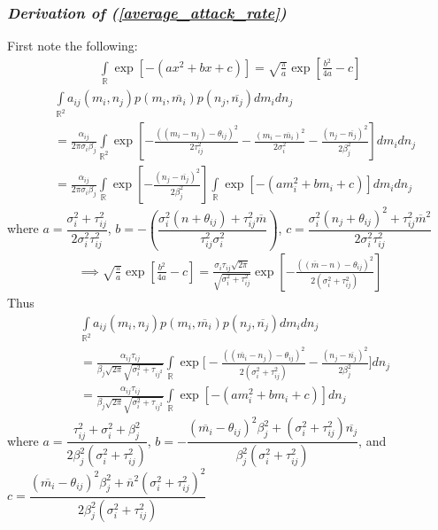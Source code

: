 \documentclass{amsart}
\theoremstyle{definition}
\theoremstyle{remark}
\numberwithin{equation}{section}
\begin{document}
\subsubsection*{\textbf{\textit{Derivation of (\ref{average_attack_rate})}}}
First note the following:
\begin{align*}
	\int\limits_{\mathbb{R}}\exp\left[-(ax^2 + bx + c)\right] = \sqrt{\frac{\pi}{a}}\exp\left[\frac{b^2}{4a} - c\right]
\end{align*}
\begin{align*}
	&\int\limits_{\mathbb{R}^2}a_{ij}(m_i, n_j)p(m_i, \overline{m_i})p(n_j, \overline{n_j})dm_idn_j \\
	&= \frac{\alpha_{ij}}{2\pi\sigma_i\beta_j}\int\limits_{\mathbb{R}^2}\exp\left[-\frac{((m_i - n_j) - \theta_{ij})^2}{2\tau_{ij}^2} - \frac{(m_i - \overline{m_i})^2}{2\sigma_i^2} - \frac{(n_j - \overline{n_j})^2}{2\beta_j^2}\right]dm_idn_j \\
	&= \frac{\alpha_{ij}}{2\pi\sigma_i\beta_j}\int\limits_{\mathbb{R}}\exp\left[-\frac{(n_j - \overline{n_j})^2}{2\beta_j^2}\right]\int\limits_{\mathbb{R}}\exp\left[-(am_i^2 + bm_i + c)\right]dm_idn_j
\end{align*}
where $a = \dfrac{\sigma_i^2 + \tau_{ij}^2}{2\sigma_i^2\tau_{ij}^2}$, $b = -\left(\dfrac{\sigma_i^2(n + \theta_{ij}) + \tau_{ij}^2\overline{m}}{\tau_{ij}^2\sigma_i^2}\right)$, $c = \dfrac{\sigma_i^2(n_j + \theta_{ij})^2 + \tau_{ij}^2\overline{m}^2}{2\sigma_i^2\tau_{ij}^2}$
\begin{align*}
	\implies \sqrt{\frac{\pi}{a}}\exp\left[\frac{b^2}{4a} - c\right] = \frac{\sigma_i\tau_{ij}\sqrt{2\pi}}{\sqrt{\sigma_i^2 + \tau_{ij}^2}}\exp\left[-\frac{((\overline{m} - n) - \theta_{ij})^2}{2(\sigma_i^2 + \tau_{ij}^2)}\right]
\end{align*}
Thus
\begin{align*}
	&\int\limits_{\mathbb{R}^2}a_{ij}(m_i, n_j)p(m_i, \overline{m_i})p(n_j, \overline{n_j})dm_idn_j \\
	&= \frac{\alpha_{ij}\tau_{ij}}{\beta_j\sqrt{2\pi}\sqrt{\sigma_i^2 + \tau_{ij^2}}}\int\limits_{\mathbb{R}}\exp\Bigg[-\frac{((\overline{m_i} - n_j) - \theta_{ij})^2}{2(\sigma_i^2 + \tau_{ij}^2)} - \frac{(n_j - \overline{n_j})^2}{2\beta_j^2}\Bigg]dn_j \\
	&= \frac{\alpha_{ij}\tau_{ij}}{\beta_j\sqrt{2\pi}\sqrt{\sigma_i^2 + \tau_{ij^2}}}\int\limits_{\mathbb{R}}\exp\left[-(am_i^2 + bm_i + c)\right]dn_j
\end{align*}
where $a = \dfrac{\tau_{ij}^2 + \sigma_i^2 + \beta_j^2}{2\beta_j^2(\sigma_i^2 + \tau_{ij}^2)}$, $b = -\dfrac{(\overline{m_i} - \theta_{ij})^2\beta_j^2 + (\sigma_i^2 + \tau_{ij}^2)\overline{n_j}}{\beta_j^2(\sigma_i^2 + \tau_{ij}^2)}$, and $c = \dfrac{(\overline{m_i} - \theta_{ij})^2\beta_j^2 + \overline{n}^2(\sigma_i^2 + \tau_{ij}^2)^2}{2\beta_j^2(\sigma_i^2 + \tau_{ij}^2)}$
\end{document}
